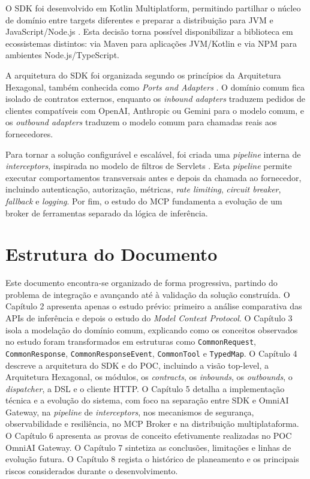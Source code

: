 \documentclass[11pt,a4paper]{report}
\begin{document}
    O SDK foi desenvolvido em Kotlin Multiplatform, permitindo partilhar o núcleo de domínio entre targets diferentes e preparar a distribuição para JVM e JavaScript/Node.js \cite{kotlin_multiplatform}. Esta decisão torna possível disponibilizar a biblioteca em ecossistemas distintos: via Maven para aplicações JVM/Kotlin e via NPM para ambientes Node.js/TypeScript.

    A arquitetura do SDK foi organizada segundo os princípios da Arquitetura Hexagonal, também conhecida como \textit{Ports and Adapters} \cite{hexagonal_ports}. O domínio comum fica isolado de contratos externos, enquanto os \textit{inbound adapters} traduzem pedidos de clientes compatíveis com OpenAI, Anthropic ou Gemini para o modelo comum, e os \textit{outbound adapters} traduzem o modelo comum para chamadas reais aos fornecedores.

    Para tornar a solução configurável e escalável, foi criada uma \textit{pipeline} interna de \textit{interceptors}, inspirada no modelo de filtros de Servlets \cite{servlet_filterchain}. Esta \textit{pipeline} permite executar comportamentos transversais antes e depois da chamada ao fornecedor, incluindo autenticação, autorização, métricas, \textit{rate limiting}, \textit{circuit breaker}, \textit{fallback} e \textit{logging}. Por fim, o estudo do MCP fundamenta a evolução de um broker de ferramentas separado da lógica de inferência.

    \section{Estrutura do Documento}
    Este documento encontra-se organizado de forma progressiva, partindo do problema de integração e avançando até à validação da solução construída. O Capítulo 2 apresenta apenas o estudo prévio: primeiro a análise comparativa das APIs de inferência e depois o estudo do \textit{Model Context Protocol}. O Capítulo 3 isola a modelação do domínio comum, explicando como os conceitos observados no estudo foram transformados em estruturas como \texttt{CommonRequest}, \texttt{CommonResponse}, \texttt{CommonResponseEvent}, \texttt{CommonTool} e \texttt{TypedMap}. O Capítulo 4 descreve a arquitetura do SDK e do POC, incluindo a visão top-level, a Arquitetura Hexagonal, os módulos, os \textit{contracts}, os \textit{inbounds}, os \textit{outbounds}, o \textit{dispatcher}, a DSL e o cliente HTTP. O Capítulo 5 detalha a implementação técnica e a evolução do sistema, com foco na separação entre SDK e OmniAI Gateway, na \textit{pipeline} de \textit{interceptors}, nos mecanismos de segurança, observabilidade e resiliência, no MCP Broker e na distribuição multiplataforma. O Capítulo 6 apresenta as provas de conceito efetivamente realizadas no POC OmniAI Gateway. O Capítulo 7 sintetiza as conclusões, limitações e linhas de evolução futura. O Capítulo 8 regista o histórico de planeamento e os principais riscos considerados durante o desenvolvimento.
\end{document}
